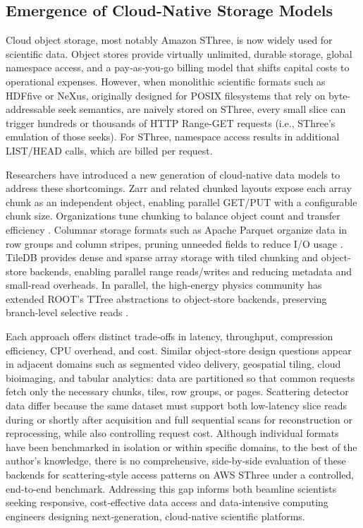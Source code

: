 \documentclass[nomenclature, english, bibtex]{kththesis}
\numberwithin{listing}{chapter}
\begin{document}
\subsection{Emergence of Cloud-Native Storage Models}
Cloud object storage, most notably Amazon \gls{SThree}, is now widely used for scientific data. Object stores provide virtually unlimited, durable storage, global namespace access, and a pay‐as‐you‐go billing model that shifts capital costs to operational expenses. However, when monolithic scientific formats such as \gls{HDFfive} or NeXus, originally designed for \gls{POSIX} filesystems that rely on byte-addressable seek semantics, are naively stored on \gls{SThree}, every small slice can trigger hundreds or thousands of \gls{HTTP} Range-GET requests (i.e., \gls{SThree}’s emulation of those seeks). For \gls{SThree}, namespace access results in additional LIST/HEAD calls, which are billed per request.

Researchers have introduced a new generation of cloud-native data models to address these shortcomings. Zarr and related chunked layouts expose each array chunk as an independent object, enabling parallel GET/PUT with a configurable chunk size. Organizations tune chunking to balance object count and transfer efficiency \cite{moore2023ome}. Columnar storage formats such as Apache Parquet organize data in row groups and column stripes, pruning unneeded fields to reduce I/O usage \cite{ivanov2020impact}. TileDB provides dense and sparse array storage with tiled chunking and object-store backends, enabling parallel range reads/writes and reducing metadata and small-read overheads. In parallel, the high-energy physics community has extended \gls{ROOT}’s \gls{TTree} abstractions to object-store backends, preserving branch-level selective reads \cite{abs-2107-07304}.

Each approach offers distinct trade‐offs in latency, throughput, compression efficiency, \gls{CPU} overhead, and cost. Similar object-store design questions appear in adjacent domains such as segmented video delivery, geospatial tiling, cloud bioimaging, and tabular analytics: data are partitioned so that common requests fetch only the necessary chunks, tiles, row groups, or pages. Scattering detector data differ because the same dataset must support both low-latency slice reads during or shortly after acquisition and full sequential scans for reconstruction or reprocessing, while also controlling request cost. Although individual formats have been benchmarked in isolation or within specific domains, to the best of the author’s knowledge, there is no comprehensive, side-by-side evaluation of these backends for scattering-style access patterns on \gls{AWS} \gls{SThree} under a controlled, end-to-end benchmark. Addressing this gap informs both beamline scientists seeking responsive, cost‐effective data access and data‐intensive computing engineers designing next‐generation, cloud‐native scientific platforms.
\end{document}
